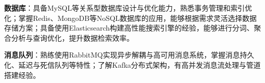 \item \textbf{数据库}：具备MySQL等关系型数据库设计与优化能力，熟悉事务管理和索引优化；掌握Redis、MongoDB等NoSQL数据库的应用，能够根据需求灵活选择数据存储方案；具备使用Elasticsearch构建高性能搜索引擎的经验，能够进行分词、聚合分析与查询优化，提升数据检索效率。
\item \textbf{消息队列}：熟练使用RabbitMQ实现异步解耦与高可用消息系统，掌握消息持久化、延迟与死信队列等特性；了解Kafka分布式架构，有高并发消息流处理与管道搭建经验。